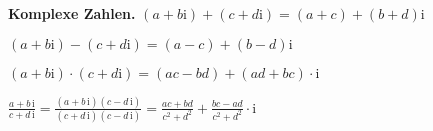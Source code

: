 \textbf{Komplexe Zahlen.} $(a+b\mathrm i)+(c+d\mathrm i)=(a+c)+(b+d)\mathrm i$

$(a + b \mathrm i) - (c + d \mathrm i) = (a - c) + (b - d) \mathrm i$

$(a+b\mathrm{i})\cdot(c+d\mathrm{i})=(ac-bd) + (ad+bc)\cdot\mathrm i$

$\frac{a+b\,\mathrm i}{c+d\,\mathrm i} = \frac{(a+b\,\mathrm i)(c-d\,\mathrm i)}{(c+d\,\mathrm i)(c-d\,\mathrm i)} = \frac{ac+bd}{c^2+d^2}+\frac{bc-ad}{c^2+d^2}\cdot\mathrm i$

